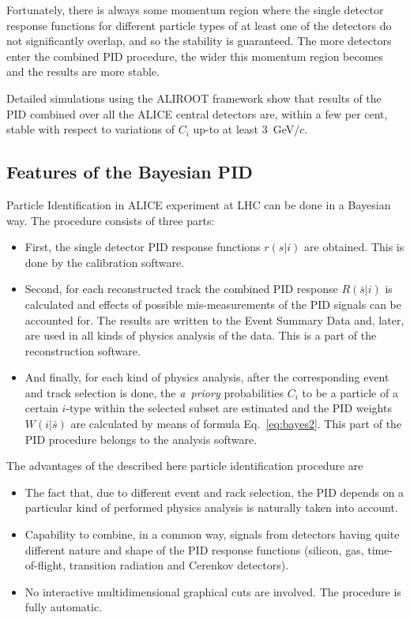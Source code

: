 \documentclass[12pt,a4paper,twoside]{article}
\begin{document}
{Fortunately, there is always some momentum region where the single detector
response functions for different particle types of at least one of the 
detectors do not significantly overlap, and so the stability
is guaranteed. The more detectors enter the combined PID procedure, the wider 
this momentum region becomes and the results are more stable.

Detailed simulations using the ALIROOT framework show that results of the 
PID combined over all the ALICE central 
detectors are, within a few per cent, stable with respect to
variations of $C_i$ up-to at least 3~GeV/$c$.


\subsection{Features of the Bayesian PID}
Particle Identification in ALICE experiment at LHC can be done in a Bayesian
way. The procedure consists of three parts:
\begin{itemize}
\item First, the single detector PID response functions 
$r(s|i)$ are obtained. This is done  by the calibration software.
\item Second, for each reconstructed track the combined PID response
 $R(\bar{s}|i)$ 
 is calculated and effects of possible mis-measurements of the PID signals
 can be accounted for. The results are written to the Event Summary Data and,
 later, are used in all kinds of physics analysis of the data.
 This is a part of the reconstruction software.
\item And finally, for each kind of physics analysis, after the corresponding
 event and track selection is done, the {\it a~priory} probabilities $C_i$ to 
be a particle of a certain $i$-type within the selected subset are estimated
and the PID weights $W(i|\bar{s})$ are calculated by means of formula
Eq.~\ref{eq:bayes2}. This part of the PID procedure belongs to the
analysis software.  
\end{itemize} 

The advantages of the described here particle identification procedure are
\begin{itemize}
\item The fact that, due to different event and rack selection, the PID depends
on a particular kind of performed physics analysis is naturally taken into 
account.
\item Capability to combine, in a common way, signals from detectors having 
quite different nature and shape of the PID response functions (silicon, gas,
time-of-flight, transition radiation and Cerenkov detectors).
\item No interactive multidimensional graphical cuts are involved. 
 The procedure is fully automatic.


\end{itemize}}
\end{document}
